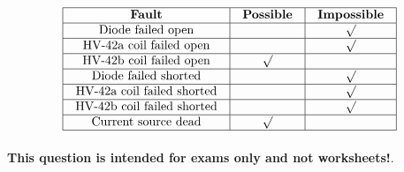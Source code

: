 

$$\vbox{\offinterlineskip
\halign{\strut
\vrule \quad\hfil # \ \hfil & 
\vrule \quad\hfil # \ \hfil & 
\vrule \quad\hfil # \ \hfil \vrule \cr
\noalign{\hrule}
%
{\bf Fault} & {\bf Possible} & {\bf Impossible} \cr
%
\noalign{\hrule}
%
Diode failed open &  & $\surd$ \cr
%
\noalign{\hrule}
%
HV-42a coil failed open &  & $\surd$ \cr
%
\noalign{\hrule}
%
HV-42b coil failed open & $\surd$ &  \cr
%
\noalign{\hrule}
%
Diode failed shorted &  & $\surd$ \cr
%
\noalign{\hrule}
%
HV-42a coil failed shorted &  & $\surd$ \cr
%
\noalign{\hrule}
%
HV-42b coil failed shorted &  & $\surd$ \cr
%
\noalign{\hrule}
%
Current source dead & $\surd$ &  \cr
%
\noalign{\hrule}
} %
}$$ %







{\bf This question is intended for exams only and not worksheets!}.




